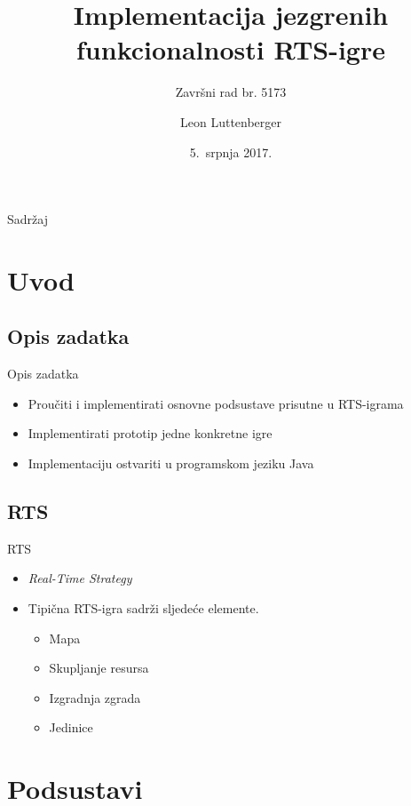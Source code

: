 \documentclass[utf8]{beamer}
\title[Implementacija RTS igre]{Implementacija jezgrenih funkcionalnosti RTS-igre}
\subtitle{Završni rad br. 5173}
\author{Leon Luttenberger}
\institute[FER]
{
  Fakultet elektrotehnike i računarstva\\
  Sveučilište u Zagrebu
}
\date{5.~srpnja 2017.}
\begin{document}
\begin{frame}
  \titlepage
\end{frame}

\begin{frame}{Sadržaj}
  \tableofcontents
\end{frame}

\section{Uvod}

\subsection{Opis zadatka}

\begin{frame}{Opis zadatka}{}
  \begin{itemize}
    \item {
      Proučiti i implementirati osnovne podsustave prisutne u RTS-igrama
    }
    \item {
      Implementirati prototip jedne konkretne igre
    }
    \item {
      Implementaciju ostvariti u programskom jeziku Java
    }
  \end{itemize}
\end{frame}

\subsection{RTS}

\begin{frame}{RTS}
  \begin{itemize}
  \item {
    \textit{Real-Time Strategy}
  }
  \item {   
    Tipična RTS-igra sadrži sljedeće elemente.
    \begin{itemize}
      \item Mapa
      \item Skupljanje resursa
      \item Izgradnja zgrada
      \item Jedinice
    \end{itemize}
  }
  \end{itemize}
\end{frame}

\section{Podsustavi}
\end{document}
